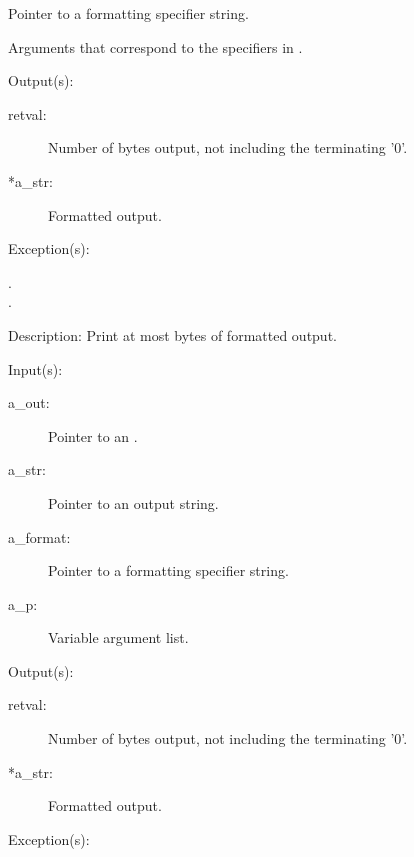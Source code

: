 \begin{capi}
\begin{capilist}
\begin{description}
			Pointer to a formatting specifier string.
		\item[...: ]
			Arguments that correspond to the specifiers in
			.
		\end{description}
	\item[Output(s): ]
		\begin{description}\item[]
		\item[retval: ]
			Number of bytes output, not including the terminating
			'{\bs}0'.
		\item[*a\_str: ]
			Formatted output.
		\end{description}
	\item[Exception(s): ]
		\begin{description}\item[]
		\item[.]
		\item[.]
		\end{description}
	\item[Description: ]
		Print at most  bytes of formatted output.
	\end{capilist}
\label{out_put_sv}
	\begin{capilist}
	\item[Input(s): ]
		\begin{description}\item[]
		\item[a\_out: ]
			Pointer to an .
		\item[a\_str: ]
			Pointer to an output string.
		\item[a\_format: ]
			Pointer to a formatting specifier string.
		\item[a\_p: ]
			Variable argument list.
		\end{description}
	\item[Output(s): ]
		\begin{description}\item[]
		\item[retval: ]
			Number of bytes output, not including the terminating
			'{\bs}0'.
		\item[*a\_str: ]
			Formatted output.
		\end{description}
	\item[Exception(s): ]

\end{capilist}
\end{capi}
